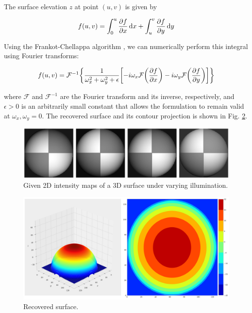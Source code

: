 \documentclass[12pt,a4paper]{article}
\begin{document}
The surface elevation $z$ at point $(u,v)$ is given by

\begin{equation}
	f(u,v) = \int_0^u \pdv{f}{x} \dd{x} + \int_u^v \pdv{f}{y} \dd{y}
\end{equation}

Using the Frankot-Chellappa algorithm \cite{frankot}, we can numerically perform this integral using Fourier transforms:

\begin{equation}
	f(u,v) = \mathcal{F}^{-1}\qty{\frac{1}{\omega_x^2 + \omega_y^2 + \epsilon} \qty[-i\omega_x \mathcal{F}\qty(\pdv{f}{x}) - i\omega_y \mathcal{F}\qty(\pdv{f}{y})]}
\end{equation}

where $\mathcal{F}$ and $\mathcal{F}^{-1}$ are the Fourier transform and its inverse, respectively, and $\epsilon > 0$ is an arbitrarily small constant that allows the formulation to remain valid at $\omega_x,\omega_y = 0$. The recovered surface and its contour projection is shown in Fig. \ref{fig:surface}.

\begin{figure}[htb]
	\centering
	\includegraphics[width=\textwidth]{intensity_maps.png}
	\caption{Given 2D intensity maps of a 3D surface under varying illumination.}
	\label{fig:intensity}
\end{figure}

\begin{figure}[htb]
	\centering
	\includegraphics[width=\textwidth]{surface.png}
	\caption{Recovered surface.}
	\label{fig:surface}
\end{figure}




\end{document}
